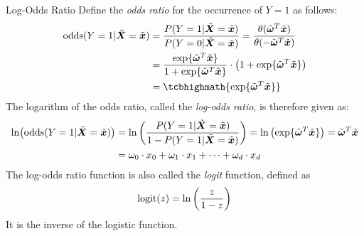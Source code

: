 %
%
%
\begin{frame}{Log-Odds Ratio}
%
Define the {\em odds ratio} for the occurrence of $Y=1$ as follows:
\begin{align}
    \odds(Y=1|\abX=\abx) & = \frac{P(Y=1|\abX=\abx)}{P(Y=0|\abX=\abx)}
    = \frac{\theta(\trueabw^T\abx)}{\theta(-\trueabw^T\abx)}\notag\\
    & =  \frac{\exp\{\trueabw^T\abx\}}{1 + \exp\{\trueabw^T\abx\}} \cdot
    \bigl(1+\exp\{\trueabw^T\abx\}\bigr)\notag\\
    & = \tcbhighmath{\exp\{\trueabw^T\abx\}}
\end{align}
The logarithm of the odds ratio, called the {\em log-odds ratio}, is
therefore given as:
\begin{align}
    \ln\bigl(\operatorname{odds}(Y=1|\tilde{{\boldsymbol X}}=\tilde{{\boldsymbol x}})\bigr) & = \ln
    \left(\frac{P(Y=1|\tilde{{\boldsymbol X}}=\tilde{{\boldsymbol x}})}{1-P(Y=1|\tilde{{\boldsymbol X}}=\tilde{{\boldsymbol x}})}\right) \notag   = \ln
    \left(\exp\{\tilde{{\bm \omega}}^T\tilde{{\boldsymbol x}}\}\right) 
    = \tilde{{\bm \omega}}^T\tilde{{\boldsymbol x}}\notag\\
    & = \omega_0 \cdot x_0 + \omega_1 \cdot x_1 + \cdots + \omega_d
    \cdot x_d
    \label{eq:reg:logit:logodds}
\end{align}
The log-odds ratio function is also called the {\em
logit} function, defined as 
\begin{align*}    
    \text{logit}(z) = \ln\left(\frac{z}{1-z}\right)
\end{align*}
It is the inverse of the logistic function.
\end{frame}

